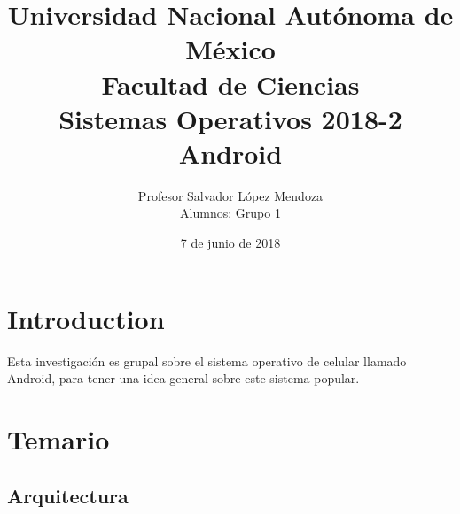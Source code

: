 \documentclass[a4paper]{article}
\title{Universidad Nacional Autónoma de México\\ Facultad de Ciencias\\ \Large{Sistemas Operativos 2018-2\\Android}}
\date{7 de junio de 2018}
\author{Profesor Salvador López Mendoza\\Alumnos: Grupo 1 }
\begin{document}
\maketitle

\section{Introduction}

Esta investigación es grupal sobre el sistema operativo de celular llamado Android, para tener una idea general sobre este sistema popular.
%
\section{Temario}

\subsection{Arquitectura}
\end{document}
